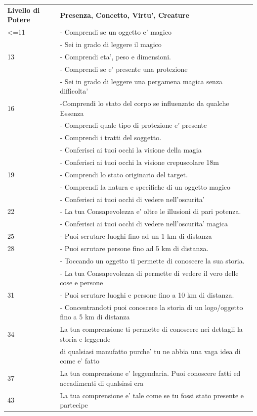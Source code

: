 \documentclass[a4paper,11pt,twoside,openany]{book}
\begin{document}
	\begin{tabular}{L{3cm} L{13cm}}
		\toprule
		\textbf{Livello di Potere} & \textbf{Presenza, Concetto, Virtu', Creature}\tabularnewline
		<=11 &- Comprendi se un oggetto e’ magico\\
		&- Sei in grado di leggere il magico\\
		13& - Comprendi eta’, peso e dimensioni.\\
		&- Comprendi se e’ presente una protezione\\
		&- Sei in grado di leggere una pergamena magica senza difficolta’\\
		16& -Comprendi lo stato del corpo se influenzato da qualche Essenza\\
		&- Comprendi quale tipo di protezione e’ presente\\
		&- Comprendi i tratti del soggetto.\\
		&- Conferisci ai tuoi occhi la visione della magia\\
		&- Conferisci ai tuoi occhi la visione crepuscolare 18m\\
		19& - Comprendi lo stato originario del target.\\
		&- Comprendi la natura e specifiche di un oggetto magico\\
		&- Conferisci ai tuoi occhi di vedere nell’oscurita’\\
		22& - La tua Consapevolezza e’ oltre le illusioni di pari potenza.\\
		&- Conferisci ai tuoi occhi di vedere nell’oscurita’ magica\\
		25& - Puoi scrutare luoghi fino ad un 1 km di distanza\\
		28& - Puoi scrutare persone fino ad 5 km di distanza.\\
		&- Toccando un oggetto ti permette di conoscere la sua storia.\\
		&- La tua Consapevolezza di permette di vedere il vero delle cose e persone\\
		31& - Puoi scrutare luoghi e persone fino a 10 km di distanza.\\
		&- Concentrandoti puoi conoscere la storia di un logo/oggetto fino a 5 km di distanza\\
		34& La tua comprensione ti permette di conoscere nei dettagli la storia e
		leggende\\
		& di qualsiasi manufatto purche’ tu ne abbia una vaga idea di come e’ fatto\\
		37& La tua comprensione e’ leggendaria. Puoi conoscere fatti ed accadimenti  di qualsiasi era\\
		43& La tua comprensione e’ tale come se tu fossi stato presente e partecipe\\
	\end{tabular}
	
\end{document}
